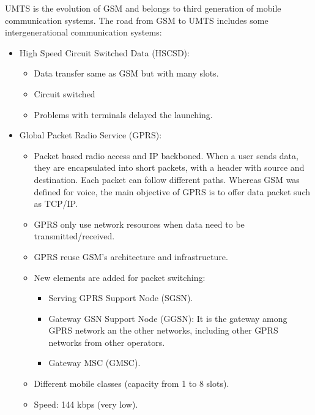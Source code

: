 \documentclass[
	12pt,
	twoside
]{book}
\begin{document}
UMTS is the evolution of GSM and belongs to third generation of mobile communication systems. The road from GSM to UMTS includes some intergenerational communication systems:
\begin{itemize}
	\item {
		High Speed Circuit Switched Data (HSCSD):
		\begin{itemize}
			\item Data transfer same as GSM but with many slots.
			\item Circuit switched
			\item Problems with terminals delayed the launching.
		\end{itemize}
	}
	\item {
		Global Packet Radio Service (GPRS):
		\begin{itemize}
			\item Packet based radio access and IP backboned. When a user sends data, they are encapsulated into short packets, with a header with source and destination. Each packet can follow different paths. Whereas GSM was defined for voice, the main objective of GPRS is to offer data packet such as TCP/IP.
			\item GPRS only use network resources when data need to be transmitted/received.
			\item GPRS reuse GSM’s architecture and infrastructure.
			\item {
				New elements are added for packet switching:
				\begin{itemize}
					\item Serving GPRS Support Node (SGSN).
					\item Gateway GSN Support Node (GGSN): It is the gateway among GPRS network an the other networks, including other GPRS networks from other operators.
					\item Gateway MSC (GMSC).
				\end{itemize}
			}
			\item Different mobile classes (capacity from 1 to 8 slots).
			\item Speed: 144 kbps (very low).
		\end{itemize}

}
\end{itemize}
\end{document}

